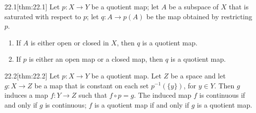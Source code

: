 \begin{thmBox}{22.1}[thm:22.1]
    Let \( p: X \rightarrow Y \) be a quotient map; let \( A \) be a subspace of
    \( X \) that is saturated with respect to \( p \); let \( q: A \rightarrow 
    p ( A ) \) be the map obtained by restricting \( p \).
    \begin{enumerate}
        \item If \( A \) is either open or closed in \( X \), then \( q \) is 
            a quotient map.
        \item If \( p \) is either an open map or a closed map, then \( q \) is
            a quotient map.
    \end{enumerate}

    \baseRule

    \begin{proofBox}

    \end{proofBox}
\end{thmBox}

\begin{thmBox}{22.2}[thm:22.2]
    Let \( p: X \rightarrow Y \) be a quotient map.
    Let \( Z \) be a space and let \( g: X \rightarrow Z \) be a map that is 
    constant on each set \( p^{ -1 } ( \{ y \} ) \), for \( y \in Y \).
    Then \( g \) induces a map \( f: Y \rightarrow Z \) such that 
    \( f \circ p = g \). 
    The induced map \( f \) is continuous if and only if \( g \) is continuous;
    \( f \) is a quotient map if and only if \( g \) is a quotient map.
    \begin{center}
    \end{center}

    \baseRule

    \begin{proofBox}

    \end{proofBox}
\end{thmBox}

